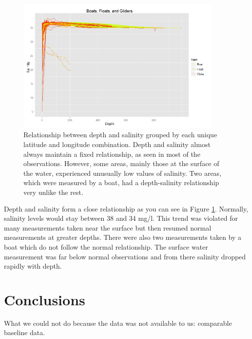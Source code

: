 \documentclass[authoryear,12pt]{elsarticle}
\begin{document}
\begin{figure}[htbp] %
   \centering
   \includegraphics[width=4in]{salinity-depth.jpeg} 
   \caption{Relationship between depth and salinity grouped by each unique latitude and longitude combination. Depth and salinity almost always maintain a fixed relationship, as seen in most of the observations. However, some areas, mainly those at the surface of the water, experienced unusually low values of salinity. Two areas, which were measured by a boat, had a depth-salinity relationship very unlike the rest.}
   \label{Depth-Salinity}
\end{figure}
Depth and salinity form a close relationship as you can see in Figure \ref {Depth-Salinity}. Normally, salinity levels would stay between 38 and 34 mg/l. This trend was violated for many measurements taken near the surface but then resumed normal measurements at greater depths. There were also two measurements taken by a boat which do not follow the normal relationship. The surface water measurement was far below normal observations and from there salinity dropped rapidly with depth. 



\section{Conclusions}
What we could not do because the data was not available to us: comparable baseline data. 
\end{document}
